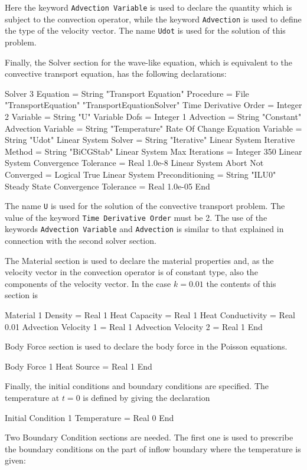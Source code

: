 Here the keyword {\tt Advection Variable} is used to declare the quantity
which is subject to the convection operator, while the keyword {\tt Advection}
is used to define the type of the velocity vector.
The name {\tt Udot} is used for the solution of this problem.

Finally, the Solver section for the wave-like equation, which is equivalent to 
the convective transport equation, has the following declarations:

\ttbegin
Solver 3  
  Equation = String "Transport Equation"
  Procedure = File "TransportEquation" "TransportEquationSolver"
  Time Derivative Order = Integer 2
  Variable = String "U"
  Variable Dofs = Integer 1  
  Advection = String "Constant"
  Advection Variable = String "Temperature" 
  Rate Of Change Equation Variable = String "Udot"
  Linear System Solver = String "Iterative"
  Linear System Iterative Method = String "BiCGStab"
  Linear System Max Iterations = Integer 350
  Linear System Convergence Tolerance = Real 1.0e-8
  Linear System Abort Not Converged = Logical True
  Linear System Preconditioning = String "ILU0"
  Steady State Convergence Tolerance = Real 1.0e-05
End
\ttend

The name {\tt U} is used for the solution of the convective transport problem. 
The value of the keyword {\tt Time Derivative Order} must be 2.
The use of the keywords {\tt Advection Variable} and {\tt Advection}
is similar to that explained in connection with the second solver section.  

The Material section is used to declare the material properties and,
as the velocity vector in the convection operator is of constant type,
also the components of the velocity vector. In the case $k=0.01$ the contents 
of this section is  

\ttbegin
Material 1
  Density = Real 1
  Heat Capacity = Real 1
  Heat Conductivity = Real 0.01
  Advection Velocity 1 = Real 1
  Advection Velocity 2 = Real 1
End
\ttend

Body Force section is used to declare the body force in the Poisson
equations.

\ttbegin
Body Force 1
  Heat Source = Real 1
End
\ttend

Finally, the initial conditions and boundary conditions are specified. 
The temperature at $t=0$ is defined by giving the declaration  

\ttbegin
Initial Condition 1
  Temperature = Real 0
End
\ttend

Two Boundary Condition sections are needed. The first one is used 
to prescribe the boundary conditions on the part of inflow boundary where
the temperature is given: 

